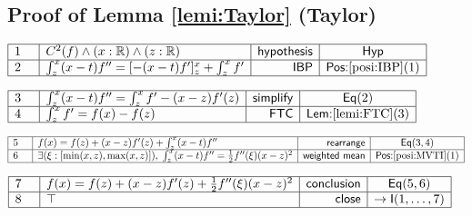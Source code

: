 \documentclass[11pt,reqno]{amsart}
\providecommand{\R}{\mathbb{R}}
\begin{document}
	\subsection*{Proof of Lemma \protect\ref{lemi:Taylor} (\textsf{Taylor})}
	\noindent$\begin{array}{|m{0.5cm}|l|r|c|}
	\hline
	1 & C^{2}(f)\wedge(x:\R)\wedge(z:\R) & \mathsf{hypothesis} & \mathsf{Hyp} \\ \hline
	2 & \int_{z}^{x}(x-t)f^{\prime\prime}=[-(x-t)f^{\prime}]_{z}^{x}+\int_{z}^{x}f^{\prime} & \mathsf{IBP} & \textsf{Pos:}\ref{posi:IBP}(1) \\ \hline
	\end{array}$
	\par\nointerlineskip\noindent$\begin{array}{|m{0.5cm}|l|r|c|}
	\hline
	3 & \int_{z}^{x}(x-t)f^{\prime\prime}=\int_{z}^{x}f^{\prime}-(x-z)f^{\prime}(z) & \mathsf{simplify} & \mathsf{Eq}(2) \\ \hline
	4 & \int_{z}^{x}f^{\prime}=f(x)-f(z) & \mathsf{FTC} & \textsf{Lem:}\ref{lemi:FTC}(3) \\ \hline
	\end{array}$
	\par\nointerlineskip\noindent$\begin{array}{|m{0.5cm}|l|r|c|}
	\hline
	5 & f(x)=f(z)+(x-z)f^{\prime}(z)+\int_{z}^{x}(x-t)f^{\prime\prime} & \mathsf{rearrange} & \mathsf{Eq}(3,4) \\ \hline
	6 & \exists (\xi:[\min(x,z),\max(x,z)]),\;\int_{z}^{x}(x-t)f^{\prime\prime}=\tfrac12 f^{\prime\prime}(\xi)(x-z)^{2} & \mathsf{weighted\ mean} & \textsf{Pos:}\ref{posi:MVTI}(1) \\ \hline
	\end{array}$
	\par\nointerlineskip\noindent$\begin{array}{|m{0.5cm}|l|r|c|}
	\hline
	7 & f(x)=f(z)+(x-z)f^{\prime}(z)+\tfrac12 f^{\prime\prime}(\xi)(x-z)^{2} & \mathsf{conclusion} & \mathsf{Eq}(5,6) \\ \hline
	8 & \top & \mathsf{close} & \to\mathsf{I}(1,\dots,7) \\ \hline
	\end{array}$
	\medskip
	
\end{document}
